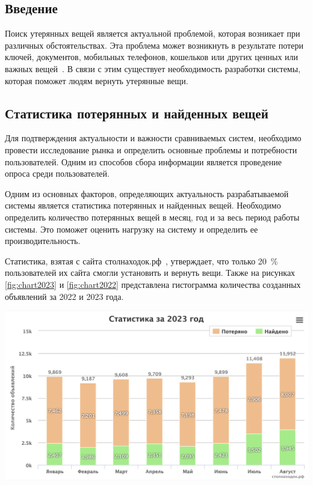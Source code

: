 \documentclass{mirea-article}
\newenvironment{Figure}
{\par\medskip\noindent\minipage{\linewidth}}
{\endminipage\par\medskip}
\begin{document}
	\begin{multicols}{2}
		
		
		\subsection*{Введение}
		\label{sec:introduction}
		
		Поиск утерянных вещей является актуальной проблемой, которая возникает при различных обстоятельствах. Эта проблема может возникнуть в результате потери ключей, документов, мобильных телефонов, кошельков или других ценных или важных вещей~\cite{bib:m24_losts_article,bib:usinsk_losts_article}. В связи с этим существует необходимость разработки системы, которая поможет людям вернуть утерянные вещи.
		
		\subsection*{Статистика потерянных и найденных вещей}
		
		Для подтверждения актуальности и важности сравниваемых систем, необходимо провести исследование рынка и определить основные проблемы и потребности пользователей. Одним из способов сбора информации является проведение опроса среди пользователей.
		
		Одним из основных факторов, определяющих актуальность разрабатываемой системы является статистика потерянных и найденных вещей. Необходимо определить количество потерянных вещей в месяц, год и за весь период работы системы. Это поможет оценить нагрузку на систему и определить ее производительность.
		
		Статистика, взятая с сайта столнаходок.рф~\cite{bib:stol_nahodok}, утверждает, что только 20~\% пользователей их сайта смогли установить и вернуть вещи. Также на рисунках \ref{fig:chart2023} и \ref{fig:chart2022} представлена гистограмма количества созданных объявлений за 2022 и 2023 года.
		
		\begin{Figure}
			\centering
			\includegraphics[width=\textwidth]{../images/chart2023}
			\label{fig:chart2023}
		\end{Figure}
	

\end{multicols}
\end{document}
